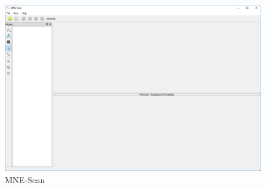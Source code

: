 \begin{figure}
	
	\begin{center}
		
		\includegraphics[scale=0.3]{Figures/MNE-Scan.png}
	
	\end{center}
	
	\caption{MNE-Scan}

\end{figure}

